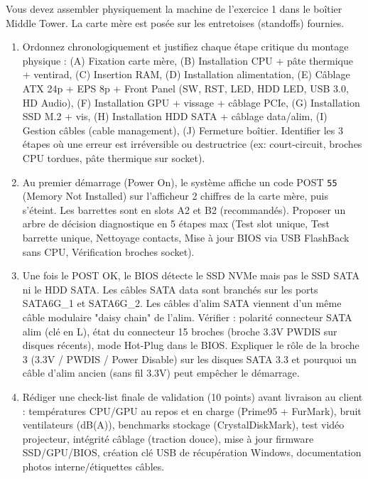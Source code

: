 \documentclass[11pt]{article}
\begin{document}
\begin{exercice}
Vous devez assembler physiquement la machine de l'exercice 1 dans le boîtier Middle Tower. La carte mère est posée sur les entretoises (standoffs) fournies.
\begin{enumerate}
    \item Ordonnez chronologiquement et justifiez chaque étape critique du montage physique : (A) Fixation carte mère, (B) Installation CPU + pâte thermique + ventirad, (C) Insertion RAM, (D) Installation alimentation, (E) Câblage ATX 24p + EPS 8p + Front Panel (SW, RST, LED, HDD LED, USB 3.0, HD Audio), (F) Installation GPU + vissage + câblage PCIe, (G) Installation SSD M.2 + vis, (H) Installation HDD SATA + câblage data/alim, (I) Gestion câbles (cable management), (J) Fermeture boîtier. Identifier les 3 étapes où une erreur est irréversible ou destructrice (ex: court-circuit, broches CPU tordues, pâte thermique sur socket).
    \item Au premier démarrage (Power On), le système affiche un code POST \texttt{55} (Memory Not Installed) sur l'afficheur 2 chiffres de la carte mère, puis s'éteint. Les barrettes sont en slots A2 et B2 (recommandés). Proposer un arbre de décision diagnostique en 5 étapes max (Test slot unique, Test barrette unique, Nettoyage contacts, Mise à jour BIOS via USB FlashBack sans CPU, Vérification broches socket).
    \item Une fois le POST OK, le BIOS détecte le SSD NVMe mais pas le SSD SATA ni le HDD SATA. Les câbles SATA data sont branchés sur les ports SATA6G\_1 et SATA6G\_2. Les câbles d'alim SATA viennent d'un même câble modulaire "daisy chain" de l'alim. Vérifier : polarité connecteur SATA alim (clé en L), état du connecteur 15 broches (broche 3.3V PWDIS sur disques récents), mode Hot-Plug dans le BIOS. Expliquer le rôle de la broche 3 (3.3V / PWDIS / Power Disable) sur les disques SATA 3.3 et pourquoi un câble d'alim ancien (sans fil 3.3V) peut empêcher le démarrage.
    \item Rédiger une check-list finale de validation (10 points) avant livraison au client : températures CPU/GPU au repos et en charge (Prime95 + FurMark), bruit ventilateurs (dB(A)), benchmarks stockage (CrystalDiskMark), test vidéo projecteur, intégrité câblage (traction douce), mise à jour firmware SSD/GPU/BIOS, création clé USB de récupération Windows, documentation photos interne/étiquettes câbles.
\end{enumerate}
\end{exercice}
\end{document}
